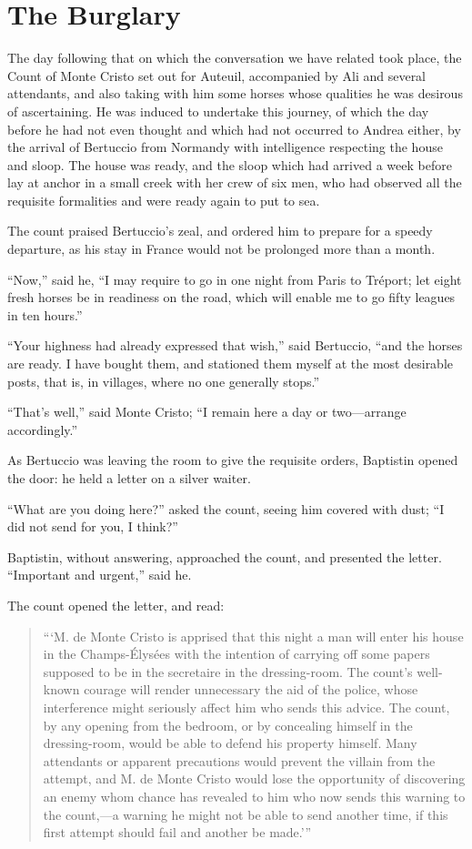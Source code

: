 \chapter{The Burglary}

The day following that on which the conversation we have related took
place, the Count of Monte Cristo set out for Auteuil, accompanied by
Ali and several attendants, and also taking with him some horses whose
qualities he was desirous of ascertaining. He was induced to undertake
this journey, of which the day before he had not even thought and which
had not occurred to Andrea either, by the arrival of Bertuccio from
Normandy with intelligence respecting the house and sloop. The house
was ready, and the sloop which had arrived a week before lay at anchor
in a small creek with her crew of six men, who had observed all the
requisite formalities and were ready again to put to sea.

The count praised Bertuccio’s zeal, and ordered him to prepare for a
speedy departure, as his stay in France would not be prolonged more
than a month.

“Now,” said he, “I may require to go in one night from Paris to
Tréport; let eight fresh horses be in readiness on the road, which will
enable me to go fifty leagues in ten hours.”

“Your highness had already expressed that wish,” said Bertuccio, “and
the horses are ready. I have bought them, and stationed them myself at
the most desirable posts, that is, in villages, where no one generally
stops.”

“That’s well,” said Monte Cristo; “I remain here a day or two—arrange
accordingly.”

As Bertuccio was leaving the room to give the requisite orders,
Baptistin opened the door: he held a letter on a silver waiter.

“What are you doing here?” asked the count, seeing him covered with
dust; “I did not send for you, I think?”

Baptistin, without answering, approached the count, and presented the
letter. “Important and urgent,” said he.

The count opened the letter, and read:

\begin{quote}
{\small“‘M. de Monte Cristo is apprised that this night a man will enter his
house in the Champs-Élysées with the intention of carrying off some
papers supposed to be in the secretaire in the dressing-room. The
count’s well-known courage will render unnecessary the aid of the
police, whose interference might seriously affect him who sends this
advice. The count, by any opening from the bedroom, or by concealing
himself in the dressing-room, would be able to defend his property
himself. Many attendants or apparent precautions would prevent the
villain from the attempt, and M. de Monte Cristo would lose the
opportunity of discovering an enemy whom chance has revealed to him who
now sends this warning to the count,—a warning he might not be able to
send another time, if this first attempt should fail and another be
made.’”}
\end{quote}

